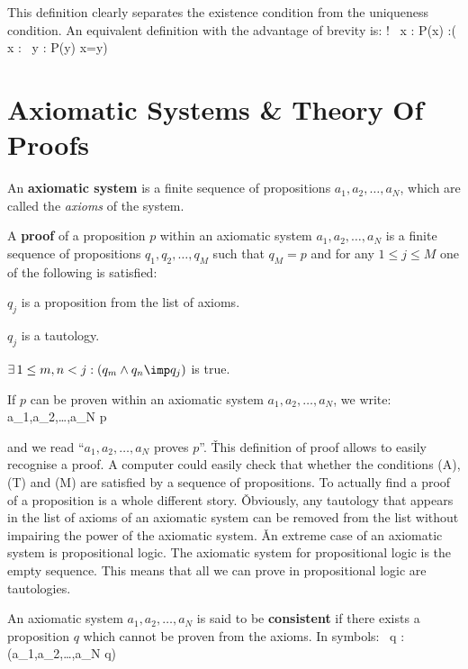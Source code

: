 This definition clearly separates the existence condition from the uniqueness condition. An equivalent definition
with the advantage of brevity is:
\bse
\exists ! \, x : P(x) :\eqv (\exists \, x : \forall \, y : P(y) \eqv x=y)
\ese

\section{Axiomatic Systems \& Theory Of Proofs}

An \textbf{axiomatic system} is a finite sequence of propositions $a_1,a_2, \ldots,a_N$, which are called the
\emph{axioms} of the system.
\ed

\bd [Proof]
A \textbf{proof} of a proposition $p$ within an axiomatic system $a_1,a_2,\ldots,a_N$ is a finite
sequence of propositions $q_1,q_2,\ldots,q_M$ such that $q_M=p$ and for any $1\leq j \leq M$ one of the following is
satisfied:
\ben
\item[(A)] $q_j$ is a proposition from the list of axioms.
\item[(T)] $q_j$ is a tautology.
\item[(M)] $\exists \, 1\leq m,n <j : (q_m\land q_n \imp q_j)$ is true.
\een
\ed

If $p$ can be proven within an axiomatic system $a_1,a_2,\ldots,a_N$, we write:
\bse
a_1,a_2,\ldots,a_N \vdash p
\ese

and we read ``$a_1,a_2,\ldots,a_N$ proves $p$''. \v

This definition of proof allows to easily recognise a proof. A computer could easily check that whether the
conditions (A), (T) and (M) are satisfied by a sequence of propositions. To actually find a proof of a proposition is
a whole different story. \v

Obviously, any tautology that appears in the list of axioms of an axiomatic system can be removed from the list
without impairing the power of the axiomatic system. \v

An extreme case of an axiomatic system is propositional logic. The axiomatic system for propositional logic is the
empty sequence. This means that all we can prove in propositional logic are tautologies.

\bd [Consistent] An axiomatic system $a_1,a_2,\ldots,a_N$ is said to be \textbf{consistent} if
there exists a proposition $q$ which cannot be proven from the axioms. In symbols:
\bse
\exists \, q : \neg (a_1,a_2,\ldots,a_N \vdash q)
\ese
\ed

